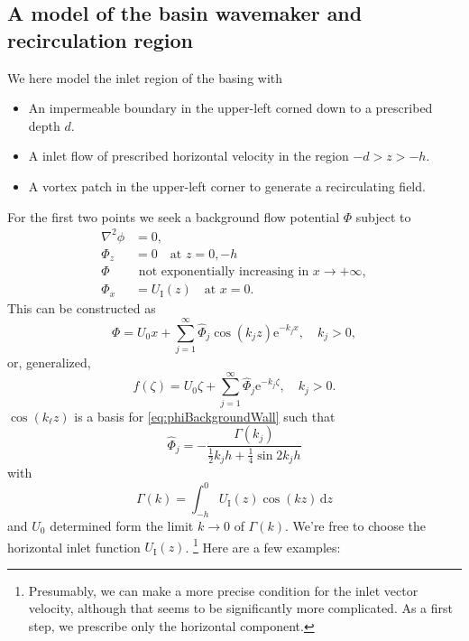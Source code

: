 \documentclass[a4paper,12pt]{article}
\newcommand{\mr}{\mathrm}
\newcommand{\ee}{\mr{e}}
\renewcommand{\_}[1]{_\mr{#1}}
\begin{document}
\subsection{A model of the basin wavemaker and recirculation region}
We here model the inlet region of the basing with
\begin{itemize}
	\item An impermeable boundary in the upper-left corned down to a prescribed depth $d$.
	\item A inlet flow of prescribed horizontal velocity in the region $-d>z>-h$.
	\item A vortex patch in the upper-left corner to generate a recirculating field. 
\end{itemize}
For the first two points we seek a background flow potential $\Phi$ subject to 
\begin{align*}
\nabla^2\phi&=0,\\
\Phi_z &= 0 \quad \text{at } z=0,-h\\
\Phi &\text{ not exponentially increasing in }x\to+\infty,\\
\Phi_x &= U\_I(z) \quad \text{at } x=0.
\end{align*}
This can be constructed as
\begin{equation}
\Phi =U_0 x+ \sum_{j=1}^\infty \hat\Phi_j \cos(k_j z)\ee^{-k_j x}, \quad k_j>0,
\label{eq:phiBackgroundWall}
\end{equation}
or, generalized,
\begin{equation}
f(\zeta) = U_0 \zeta+ \sum_{j=1}^\infty \hat\Phi_j \ee^{-k_j\zeta}, \quad k_j>0.
\label{eq:f_wall}
\end{equation}
$\cos(k_\ell z)$ is a basis for \eqref{eq:phiBackgroundWall} such that
\[
\hat\Phi_j = -\frac{\Gamma(k_j)}{\frac12 k_j h + \frac14\sin2k_jh}
\]
with
\begin{equation}
\Gamma(k) = \int_{-h}^0 \!U\_I(z)\cos(k z)\,\mr d z
\label{eq:Gamma}
\end{equation}
and $U_0$ determined form the limit $k\to0$ of $\Gamma(k)$.
We're free to choose the horizontal inlet function $U\_I(z)$.%
\footnote{Presumably, we can make a more precise condition for the inlet vector velocity, although that seems to be significantly more complicated. As a first step, we prescribe only the horizontal component.}
 Here are a few examples:
\end{document}

